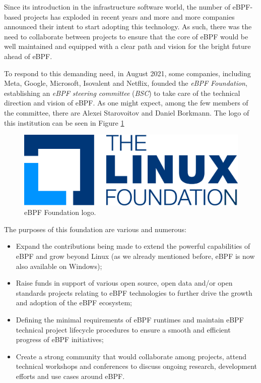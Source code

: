 Since its introduction in the infrastructure software world, the number of eBPF-based projects has exploded in recent years and more and more companies announced their intent to start adopting this technology.
As such, there was the need to collaborate between projects to ensure that the core of eBPF would be well maintained and equipped with a clear path and vision for the bright future ahead of eBPF.

To respond to this demanding need, in August 2021, some companies, including Meta, Google, Microsoft, Isovalent and Netflix, founded the \textit{eBPF Foundation}, establishing an \textit{eBPF steering committee} (\textit{BSC}) to take care of the technical direction and vision of eBPF.
As one might expect, among the few members of the committee, there are Alexei Starovoitov and Daniel Borkmann.
The logo of this institution can be seen in Figure \ref{fig:eBPF_foundation_logo}

\begin{figure}[h]
	\centering
	\includegraphics[width=0.7\linewidth]{images/History/lf-stacked-color.png}
	\caption{eBPF Foundation logo.}
	\label{fig:eBPF_foundation_logo}
\end{figure}

The purposes of this foundation are various and numerous:

\begin{itemize}
	\item 
		Expand the contributions being made to extend the powerful capabilities of eBPF and grow beyond Linux (as we already mentioned before, eBPF is now also available on Windows);
	\item 
		Raise funds in support of various open source, open data and/or open standards projects relating to eBPF technologies to further drive the growth and adoption of the eBPF ecosystem;
	\item 
		Defining the minimal requirements of eBPF runtimes and maintain eBPF technical project lifecycle procedures to ensure a smooth and efficient progress of eBPF initiatives;
	\item 
		Create a strong community that would collaborate among projects, attend technical workshops and conferences to discuss ongoing research, development efforts and use cases around eBPF.
\end{itemize} 

